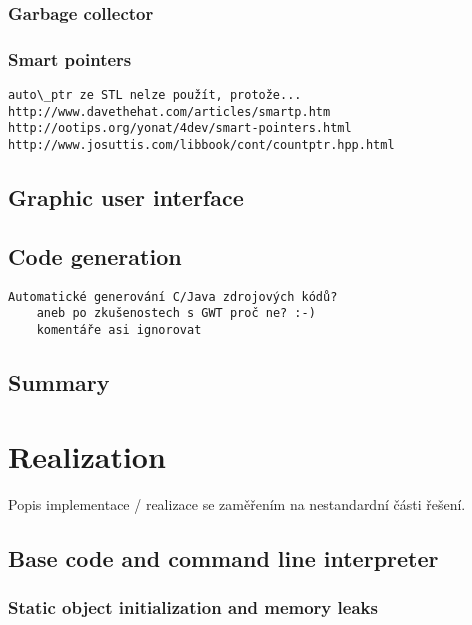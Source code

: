 \documentclass[11pt,twoside,a4paper]{book}
\begin{document}
\subsection{Garbage collector}

\subsection{Smart pointers}

\begin{verbatim}
auto\_ptr ze STL nelze použít, protože...
http://www.davethehat.com/articles/smartp.htm
http://ootips.org/yonat/4dev/smart-pointers.html
http://www.josuttis.com/libbook/cont/countptr.hpp.html
\end{verbatim}

\section{Graphic user interface}


\section{Code generation}

\begin{verbatim}
Automatické generování C/Java zdrojových kódů?
	aneb po zkušenostech s GWT proč ne? :-)
	komentáře asi ignorovat
\end{verbatim}


\section{Summary}




\chapter{Realization}

Popis implementace / realizace se zaměřením na nestandardní části řešení.

\section{Base code and command line interpreter}

\subsection{Static object initialization and memory leaks}
\end{document}
